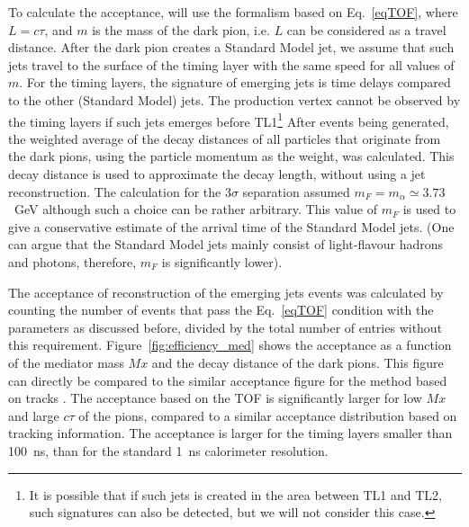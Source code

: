 To calculate the acceptance, will use the formalism based on Eq.~\ref{eqTOF}, where $L=c\tau$, and $m$ is the mass
of the dark pion, i.e. $L$ can be considered as a travel distance. After the dark pion creates a Standard Model jet, we assume that
such jets travel to the surface of the timing layer with the same speed for all values of $m$.
For the timing layers, the signature of emerging jets is time delays compared to the other (Standard Model) jets. The  production vertex
cannot be observed by the timing layers if such jets emerges before TL1\footnote{It is possible that if such jets is created in the area between TL1 and TL2,
such signatures can also be detected, but we will not consider this case.}
After events being generated, the weighted average of the decay distances of all particles that originate from
the dark pions, using the particle momentum as the weight, was calculated. This decay distance is used
to approximate the decay length, without using a jet reconstruction.  
The  calculation for the $3\sigma$ separation assumed $m_F=m_{\alpha}\simeq 3.73$~GeV although such a choice can be rather arbitrary.
This value of $m_F$ is used to give a conservative estimate of the arrival time of the Standard Model jets.
(One can argue that the Standard Model jets mainly consist of light-flavour hadrons and photons, therefore, $m_F$ is significantly lower).

The acceptance of reconstruction of the emerging jets events was calculated by counting the number of events that pass the 
Eq.~\ref{eqTOF} condition  with the parameters as discussed before, divided by the total number of entries
without this requirement. Figure~\ref{fig:efficiency_med} shows the acceptance as a function of the mediator mass $Mx$ and the decay distance
of the dark pions. This figure can directly be compared to the similar acceptance figure for the method based on tracks  \cite{Sirunyan:2018njd}. 
The acceptance based on the TOF is significantly larger for low $Mx$ and large $c\tau$ of the pions, compared to a
similar acceptance distribution based on tracking information.  
The acceptance is larger for the timing layers smaller than 100~ns, than for the standard 1~ns calorimeter resolution. 

